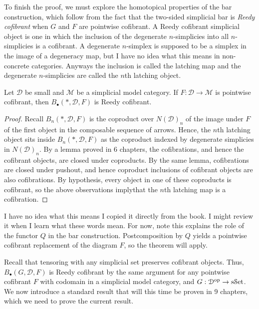 To finish the proof, we must explore the homotopical properties of the bar construction, which follow from the fact that the two-sided simplicial bar is \emph{Reedy cofibrant} when $G$ and $F$ are pointwise cofibrant. A Reedy cofibrant simplicial object is one in which the inclusion of the degenerate $n$-simplicies into all $n$-simplicies is a cofibrant. A degenerate $n$-simplex is supposed to be a simplex in the image of a degeneracy map, but I have no idea what this means in non-concrete categories. Anyways the inclusion is called the latching map and the degenerate $n$-simplicies are called the $n$th latching object.

\begin{lemma}\label{lma:5.3}
		Let $\mathcal{D} $ be small and $\mathcal{M} $ be a simplicial model category. If $F : \mathcal{D}  \to \mathcal{M} $ is pointwise cofibrant, then $B_{\bullet} (*,\mathcal{D} ,F)$ is Reedy cofibrant.
\end{lemma}
\begin{proof}
	Recall $B_n(*,\mathcal{D} ,F)$ is the coproduct over $N(\mathcal{D} )_n$ of the image under $F$ of the first object in the composable sequence of arrows. Hence, the $n$th latching object sits inside $B_n(*,\mathcal{D} ,F)$ as the coproduct indexed by degenerate simplicies in $N(\mathcal{D} )_n$. By a lemma proved in 6 chapters, the cofibrations, and hence the cofibrant objects, are closed under coproducts. By the same lemma, cofibrations are closed under pushout, and hence coproduct inclusions of cofibrant objects are also cofibrations. By hypothesis, every object in one of these coproducts is cofibrant, so the above observations implythat the $n$th latching map is a cofibration.
\end{proof}

I have no idea what this means I copied it directly from the book. I might review it when I learn what these words mean. For now, note this explains the role of the functor $Q$ in the bar construction. Postcomposition by $Q$ yields a pointwise cofibrant replacement of the diagram $F$, so the theorem will apply.

Recall that tensoring with any simplicial set preserves cofibrant objects. Thus, $B_{\bullet} (G,\mathcal{D} ,F)$ is Reedy cofibrant by the same argument for any pointwise cofibrant $F$ with codomain in a simplicial model category, and $G : \mathcal{D} ^{\mathrm{op}}  \to \mathrm{s}\mathcal{S}\mathrm{et}$. We now introduce a standard result that will this time be proven in 9 chapters, which we need to prove the current result.

